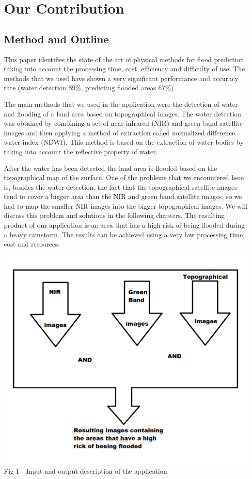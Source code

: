 \documentclass[12pt, a4paper]{report}
\begin{document}
\section{Our Contribution}
\subsection{Method and Outline}

\quad
This paper identifies the state of the art of physical methods for flood prediction taking into account the processing time, cost, efficiency and difficulty of use. The methods that we used have shown a very significant performance and accuracy rate (water detection 89\%, predicting flooded areas 67\%).
\par

The main methods that we used in the application were the detection of water and flooding of a land area based on topographical images. The water detection was obtained by combining a set of near infrared (NIR) and green band satellite images and then applying a method of extraction called normalized difference water index (NDWI). This method is based on the extraction of water bodies by taking into account the reflective property of water.
\par 

After the water has been detected the land area is flooded based on the topographical map of the surface. One of the problems that we encountered here is, besides the water detection, the fact that the topographical satellite images tend to cover a bigger area than the NIR and green band satellite images, so we had to map the smaller NIR images into the bigger topographical images. We will discuss this problem and solutions in the following chapters. The resulting product of our application is an area that has a high risk of being flooded during a heavy rainstorm. The results can be achieved using a very low processing time, cost and resources.
\par 

\begin{center}
	\includegraphics[scale=0.6]{application_outline.png} 
	Fig 1 - Input and output description of the application
\end{center}
\end{document}

